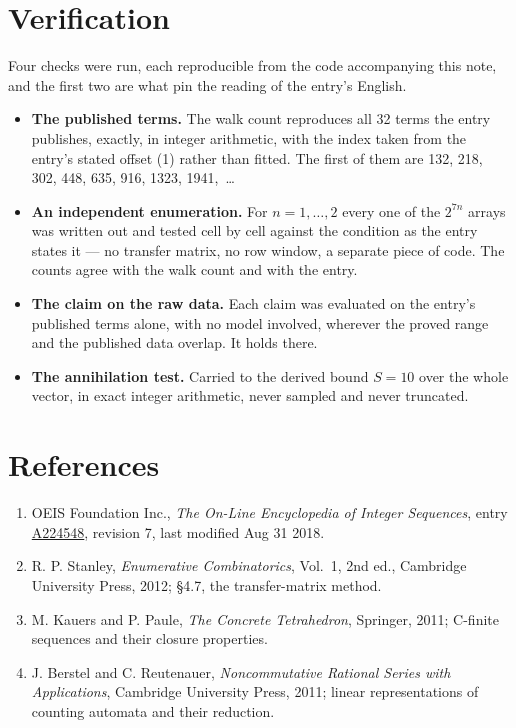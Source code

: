 \documentclass[11pt]{article}
\theoremstyle{definition}
\begin{document}
\section{Verification}

Four checks were run, each reproducible from the code accompanying this note, and the first two are what pin the reading of the entry's English.

\begin{itemize}

\item {\bfseries The published terms.} The walk count reproduces all 32 terms the entry publishes, exactly, in integer arithmetic, with the index taken from the entry's stated offset (1) rather than fitted. The first of them are 132, 218, 302, 448, 635, 916, 1323, 1941,~\dots

\item {\bfseries An independent enumeration.} For $n = 1,\dots,2$ every one of the $2^{7n}$ arrays was written out and tested cell by cell against the condition as the entry states it --- no transfer matrix, no row window, a separate piece of code. The counts agree with the walk count and with the entry.

\item {\bfseries The claim on the raw data.} Each claim was evaluated on the entry's published terms alone, with no model involved, wherever the proved range and the published data overlap. It holds there.

\item {\bfseries The annihilation test.} Carried to the derived bound $S = 10$ over the whole vector, in exact integer arithmetic, never sampled and never truncated.

\end{itemize}

\section{References}

\begin{enumerate}

\item OEIS Foundation Inc., \emph{The On-Line Encyclopedia of Integer Sequences}, entry \href{https://oeis.org/A224548}{A224548}, revision 7, last modified Aug 31 2018.

\item R. P. Stanley, \emph{Enumerative Combinatorics}, Vol.~1, 2nd ed., Cambridge University Press, 2012; \S4.7, the transfer-matrix method.

\item M. Kauers and P. Paule, \emph{The Concrete Tetrahedron}, Springer, 2011; C-finite sequences and their closure properties.

\item J. Berstel and C. Reutenauer, \emph{Noncommutative Rational Series with Applications}, Cambridge University Press, 2011; linear representations of counting automata and their reduction.

\end{enumerate}
\end{document}
